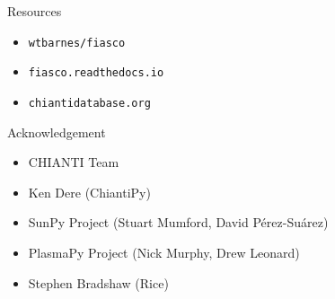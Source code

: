 \documentclass[12pt,aspectratio=169]{beamer}
\begin{document}
{%
\begin{frame}{Resources}
    \begin{itemize}
        \LARGE
        \item[] \texttt{wtbarnes/fiasco}
        \item[] \texttt{fiasco.readthedocs.io}
        \item[] \texttt{chiantidatabase.org}   
    \end{itemize}
\end{frame}
}
\begin{frame}{Acknowledgement}
    \begin{itemize}
        \item CHIANTI Team
        \item Ken Dere (ChiantiPy)
        \item SunPy Project (Stuart Mumford, David Pérez-Suárez)
        \item PlasmaPy Project (Nick Murphy, Drew Leonard)
        \item Stephen Bradshaw (Rice)
    \end{itemize}
\end{frame}
\end{document}
